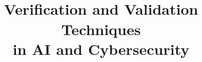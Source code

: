 \title{\rmfamily\normalfont{} \\
\large Verification and Validation Techniques \\
  in AI and Cybersecurity}
\author{}
\date{}

\maketitle